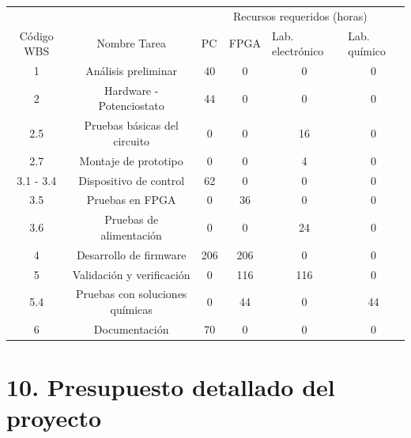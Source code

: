 \documentclass[11pt]{charter}
\begin{document}
\begin{table}[H]
\label{tab:recursos}
\begin{tabular}{|c|c|c|c|c|c|}
\hline
\cellcolor[HTML]{C0C0C0} &
  \cellcolor[HTML]{C0C0C0} &
  \multicolumn{4}{c|}{\cellcolor[HTML]{C0C0C0}Recursos requeridos (horas)} \\ \cline{3-6} 
\multirow{-2}{*}{\cellcolor[HTML]{C0C0C0}Código WBS} &
  \multirow{-2}{*}{\cellcolor[HTML]{C0C0C0}Nombre Tarea} &
  \multicolumn{1}{l|}{PC} &
  \multicolumn{1}{l|}{FPGA} &
  \multicolumn{1}{l|}{Lab. electrónico} &
  \multicolumn{1}{l|}{Lab. químico} \\ \hline
1         & Análisis preliminar             & 40  & 0   & 0   & 0  \\ \hline
2         & Hardware - Potenciostato        & 44  & 0   & 0   & 0  \\ \hline
2.5       & Pruebas básicas del circuito    & 0   & 0   & 16  & 0  \\ \hline
2.7       & Montaje de prototipo            & 0   & 0   & 4   & 0  \\ \hline
3.1 - 3.4 & Dispositivo de control          & 62  & 0   & 0   & 0  \\ \hline
3.5       & Pruebas en FPGA                 & 0   & 36  & 0   & 0  \\ \hline
3.6       & Pruebas de alimentación         & 0   & 0   & 24  & 0  \\ \hline
4         & Desarrollo de firmware          & 206 & 206 & 0   & 0  \\ \hline
5         & Validación y verificación       & 0   & 116 & 116 & 0  \\ \hline
5.4       & Pruebas con soluciones químicas & 0   & 44  & 0   & 44 \\ \hline
6         & Documentación                   & 70  & 0   & 0   & 0  \\ \hline
\end{tabular}
\end{table}


\section{10. Presupuesto detallado del proyecto}
\label{sec:presupuesto}
\end{document}
